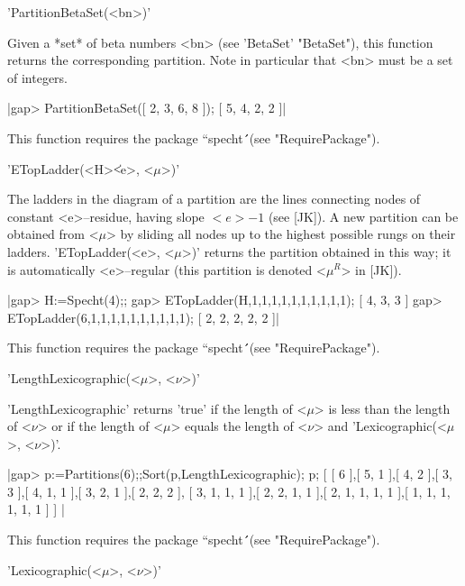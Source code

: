 
'PartitionBetaSet(<bn>)'

Given a *set* of beta numbers <bn> (see 'BetaSet' "BetaSet"), this function
returns the corresponding partition. Note in particular that <bn> must be 
a set of integers.

|gap> PartitionBetaSet([ 2, 3, 6, 8 ]);
[ 5, 4, 2, 2 ]|

This function requires the package ``specht\'\'\ (see "RequirePackage").



'ETopLadder(<H>\|<e>, <$\mu$>)'

The ladders in the diagram of a partition are the lines connecting nodes
of constant <e>--residue, having slope $<e>-1$ (see [JK]). A new partition 
can be obtained from <$\mu$> by sliding all nodes up to the highest 
possible rungs on their ladders. 'ETopLadder(<e>, <$\mu$>)' returns the 
partition obtained in this way; it is automatically <e>--regular (this 
partition is denoted <$\mu^R$> in [JK]). 

|gap> H:=Specht(4);;
gap> ETopLadder(H,1,1,1,1,1,1,1,1,1,1);
[ 4, 3, 3 ]
gap> ETopLadder(6,1,1,1,1,1,1,1,1,1,1); 
[ 2, 2, 2, 2, 2 ]|

This function requires the package ``specht\'\'\ (see "RequirePackage").



'LengthLexicographic(<$\mu$>, <$\nu$>)'

'LengthLexicographic' returns 'true' if the length of <$\mu$> is less
than the length of <$\nu$> or if the length of <$\mu$> equals the length 
of <$\nu$> and 'Lexicographic(<$\mu$>, <$\nu$>)'.

|gap> p:=Partitions(6);;Sort(p,LengthLexicographic); p;
[ [ 6 ],[ 5, 1 ],[ 4, 2 ],[ 3, 3 ],[ 4, 1, 1 ],[ 3, 2, 1 ],[ 2, 2, 2 ],
  [ 3, 1, 1, 1 ],[ 2, 2, 1, 1 ],[ 2, 1, 1, 1, 1 ],[ 1, 1, 1, 1, 1, 1 ] ]
|

This function requires the package ``specht\'\'\ (see "RequirePackage").



'Lexicographic(<$\mu$>, <$\nu$>)'


